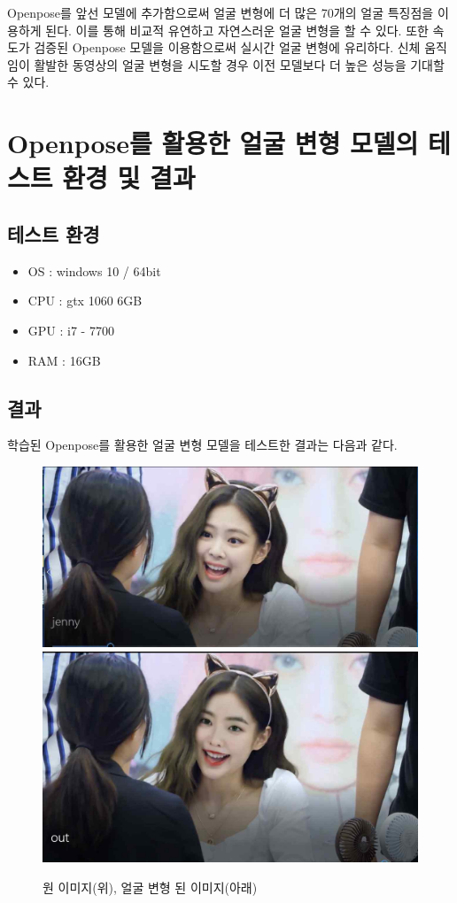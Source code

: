 \documentclass[chapter,oneside]{oblivoir}
\newcommand{\spec}{
    \begin{itemize}
        \item OS : windows 10 / 64bit
        \item CPU : gtx 1060 6GB
        \item GPU : i7 - 7700
        \item RAM : 16GB
    \end{itemize}
    }
\begin{document}
Openpose를 앞선 모델에 추가함으로써 얼굴 변형에 더 많은 70개의 얼굴 특징점을 이용하게 된다. 이를 통해 비교적 유연하고 자연스러운 얼굴 변형을 할 수 있다. 또한 속도가 검증된 Openpose 모델을 이용함으로써 실시간 얼굴 변형에 유리하다. 신체 움직임이 활발한 동영상의 얼굴 변형을 시도할 경우 이전 모델보다 더 높은 성능을 기대할 수 있다.

\section{Openpose를 활용한 얼굴 변형 모델의 테스트 환경 및 결과}

\subsection{테스트 환경}
\spec
\subsection{ 결과 }

학습된 Openpose를 활용한 얼굴 변형 모델을 테스트한 결과는 다음과 같다.
\begin{figure}[h!]
  \centering
        \includegraphics{pic/chp3/img778}
        \includegraphics{pic/chp3/img779}
  \caption{원 이미지(위), 얼굴 변형 된 이미지(아래)}
\end{figure}
\end{document}

